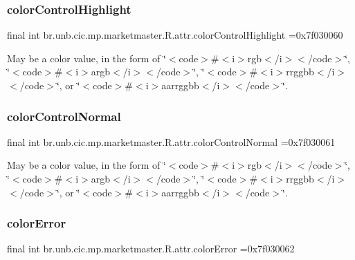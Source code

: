 \subsubsection{\texorpdfstring{color\+Control\+Highlight}{colorControlHighlight}}
{\footnotesize\ttfamily final int br.\+unb.\+cic.\+mp.\+marketmaster.\+R.\+attr.\+color\+Control\+Highlight =0x7f030060\hspace{0.3cm}{\ttfamily [static]}}

May be a color value, in the form of \char`\"{}$<$code$>$\#$<$i$>$rgb$<$/i$>$$<$/code$>$\char`\"{}, \char`\"{}$<$code$>$\#$<$i$>$argb$<$/i$>$$<$/code$>$\char`\"{}, \char`\"{}$<$code$>$\#$<$i$>$rrggbb$<$/i$>$$<$/code$>$\char`\"{}, or \char`\"{}$<$code$>$\#$<$i$>$aarrggbb$<$/i$>$$<$/code$>$\char`\"{}. \mbox{\label{classbr_1_1unb_1_1cic_1_1mp_1_1marketmaster_1_1R_1_1attr_ab0b86c06cf78b8730a261de04fa19657}} 
\subsubsection{\texorpdfstring{color\+Control\+Normal}{colorControlNormal}}
{\footnotesize\ttfamily final int br.\+unb.\+cic.\+mp.\+marketmaster.\+R.\+attr.\+color\+Control\+Normal =0x7f030061\hspace{0.3cm}{\ttfamily [static]}}

May be a color value, in the form of \char`\"{}$<$code$>$\#$<$i$>$rgb$<$/i$>$$<$/code$>$\char`\"{}, \char`\"{}$<$code$>$\#$<$i$>$argb$<$/i$>$$<$/code$>$\char`\"{}, \char`\"{}$<$code$>$\#$<$i$>$rrggbb$<$/i$>$$<$/code$>$\char`\"{}, or \char`\"{}$<$code$>$\#$<$i$>$aarrggbb$<$/i$>$$<$/code$>$\char`\"{}. \mbox{\label{classbr_1_1unb_1_1cic_1_1mp_1_1marketmaster_1_1R_1_1attr_a7b71575ba5396adbe5503e3b6c763765}} 
\subsubsection{\texorpdfstring{color\+Error}{colorError}}
{\footnotesize\ttfamily final int br.\+unb.\+cic.\+mp.\+marketmaster.\+R.\+attr.\+color\+Error =0x7f030062\hspace{0.3cm}{\ttfamily [static]}}

